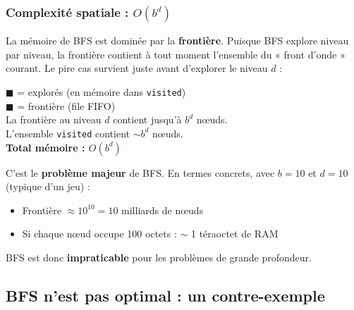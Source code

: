 \documentclass[11pt,a4paper]{article}
\begin{document}
\subsubsection*{Complexité spatiale : $O(b^d)$}

La mémoire de BFS est dominée par la \textbf{frontière}. Puisque BFS explore niveau par niveau, la frontière contient à tout moment l'ensemble du « front d'onde » courant. Le pire cas survient juste avant d'explorer le niveau $d$ :

\begin{center}
\hspace{1cm}
\begin{minipage}{0.5\textwidth}
{\small
\textcolor{blue!60}{$\blacksquare$} = explorés (en mémoire dans \texttt{visited})\\
\textcolor{orange!70}{$\blacksquare$} = frontière (file FIFO)\\[0.2cm]
La frontière au niveau $d$ contient jusqu'à $b^d$ nœuds.\\
L'ensemble \texttt{visited} contient $\sim b^d$ nœuds.\\
\textbf{Total mémoire : $O(b^d)$}
}
\end{minipage}
\end{center}

C'est le \textbf{problème majeur} de BFS. En termes concrets, avec $b = 10$ et $d = 10$ (typique d'un jeu) :
\begin{itemize}[nosep]
    \item Frontière $\approx 10^{10} = 10$ milliards de nœuds
    \item Si chaque nœud occupe 100 octets : $\sim$ 1 téraoctet de RAM
\end{itemize}

BFS est donc \textbf{impraticable} pour les problèmes de grande profondeur.

\subsection{BFS n'est pas optimal : un contre-exemple}
\end{document}
